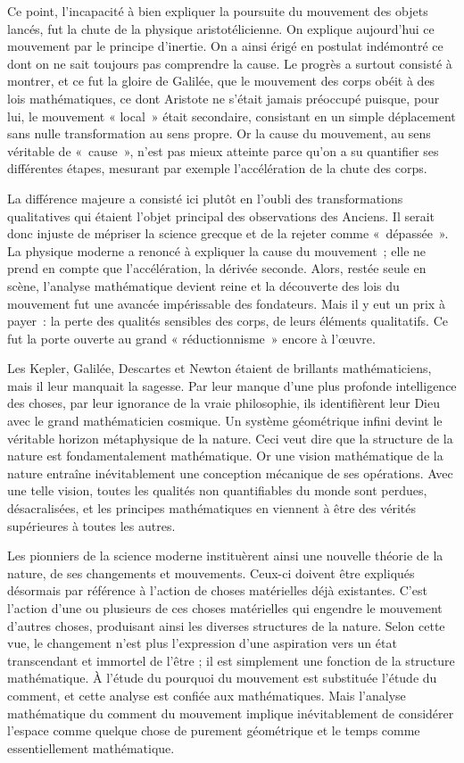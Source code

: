 \documentclass[a4paper,12pt]{article}
\begin{document}
Ce point, l'incapacité à bien expliquer la poursuite du mouvement des objets lancés, fut la chute de la physique aristotélicienne. On explique aujourd'hui ce mouvement par le principe d'inertie. On a ainsi érigé en postulat indémontré ce dont on ne sait toujours pas comprendre la cause. Le progrès a surtout consisté à montrer, et ce fut la gloire de Galilée, que le mouvement des corps obéit à des lois mathématiques, ce dont Aristote ne s'était jamais préoccupé puisque, pour lui, le mouvement « local » était secondaire, consistant en un simple déplacement sans nulle transformation au sens propre. Or la cause du mouvement, au sens véritable de « cause », n’est pas mieux atteinte parce qu'on a su quantifier ses différentes étapes, mesurant par exemple l'accélération de la chute des corps. 

La différence majeure a consisté ici plutôt en l'oubli des transformations qualitatives qui étaient l'objet principal des observations des Anciens. Il serait donc injuste de mépriser la science grecque et de la rejeter comme « dépassée ». La physique moderne a renoncé à expliquer la cause du mouvement ; elle ne prend en compte que l'accélération, la dérivée seconde. Alors, restée seule en scène, l'analyse mathématique devient reine et la découverte des lois du mouvement fut une avancée impérissable des fondateurs. Mais il y eut un prix à payer : la perte des qualités sensibles des corps, de leurs éléments qualitatifs. Ce fut la porte ouverte au grand « réductionnisme » encore à l'œuvre.

Les Kepler, Galilée, Descartes et Newton étaient de brillants mathématiciens, mais il leur manquait la sagesse. Par leur manque d'une plus profonde intelligence des choses, par leur ignorance de la vraie philosophie, ils identifièrent leur Dieu avec le grand mathématicien cosmique. Un système géométrique infini devint le véritable horizon métaphysique de la nature. Ceci veut dire que la structure de la nature est fondamentalement mathématique. Or une vision mathématique de la nature entraîne inévitablement une conception mécanique de ses opérations. Avec une telle vision, toutes les qualités non quantifiables du monde sont perdues, désacralisées, et les principes mathématiques en viennent à être des vérités supérieures à toutes les autres. 

Les pionniers de la science moderne instituèrent ainsi une nouvelle théorie de la nature, de ses changements et mouvements. Ceux-ci doivent être expliqués désormais par référence à l'action de choses matérielles déjà existantes. C'est l'action d'une ou plusieurs de ces choses matérielles qui engendre le mouvement d'autres choses, produisant ainsi les diverses structures de la nature. Selon cette vue, le changement n'est plus l'expression d'une aspiration vers un état transcendant et immortel de l'être ; il est simplement une fonction de la structure mathématique. À l'étude du pourquoi du mouvement est substituée l'étude du comment, et cette analyse est confiée aux mathématiques. Mais l'analyse mathématique du comment du mouvement implique inévitablement de considérer l'espace comme quelque chose de purement géométrique et le temps comme essentiellement mathématique. 
\end{document}
